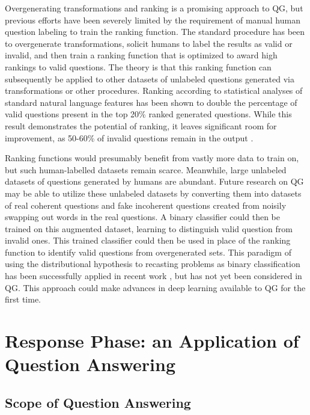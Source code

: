 Overgenerating transformations and ranking is a promising approach to QG, but previous efforts have been severely limited by the requirement of manual human question labeling to train the ranking function. The standard procedure has been to overgenerate transformations, solicit humans to label the results as valid or invalid, and then train a ranking function that is optimized to award high rankings to valid questions. The theory is that this ranking function can subsequently be applied to other datasets of unlabeled questions generated via transformations or other procedures. Ranking according to statistical analyses of standard natural language features has been shown to double the percentage of valid questions present in the top 20\% ranked generated questions. While this result demonstrates the potential of ranking, it leaves significant room for improvement, as 50-60\% of invalid questions remain in the output  \citep{heilman2011automatic}. 

Ranking functions would presumably benefit from vastly more data to train on, but such human-labelled datasets remain scarce. Meanwhile, large unlabeled datasets of questions generated by humans are abundant. Future research on QG may be able to utilize these unlabeled datasets by converting them into datasets of real coherent questions and fake incoherent questions created from noisily swapping out words in the real questions. A binary classifier could then be trained on this augmented dataset, learning to distinguish valid question from invalid ones. This trained classifier could then be used in place of the ranking function to identify valid questions from overgenerated sets. This paradigm of using the distributional hypothesis to recasting problems as binary classification has been successfully applied in recent work  \citep{collobert2011natural}, but has not yet been considered in QG. This approach could make advances in deep learning available to QG for the first time. 

\section{Response Phase: an Application of Question Answering}

\subsection{Scope of Question Answering}


